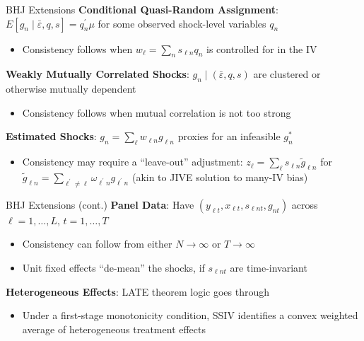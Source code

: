 \documentclass{beamer}
\begin{document}
\begin{frame}{BHJ Extensions}
\vspace{-0.3cm}
\textbf{Conditional Quasi-Random Assignment}: $E[g_n\mid \bar{\varepsilon},q,s]=q_n^\prime \mu$ for some observed shock-level variables $q_n$\smallskip
\begin{itemize}
\item Consistency follows when $w_\ell = \sum_n s_{\ell n} q_n$ is controlled for in the IV
\end{itemize}\medskip\pause{}
\textbf{Weakly Mutually Correlated Shocks}: $g_n\mid (\bar{\varepsilon},q,s)$ are clustered or otherwise mutually dependent \smallskip
\begin{itemize}
\item Consistency follows when mutual correlation is not too strong
\end{itemize}\medskip\pause{}
 \textbf{Estimated Shocks}: $g_n=\sum_\ell w_{\ell n}g_{\ell n}$ proxies for an infeasible $g_n^*$\smallskip
\begin{itemize}
\item Consistency may require a ``leave-out'' adjustment: $z_\ell=\sum_\ell s_{\ell n}\tilde{g}_{\ell n}$ for $\tilde{g}_{\ell n}=\sum_{\ell^\prime\neq \ell} \omega_{\ell^\prime n}g_{\ell^\prime n}$ (akin to JIVE solution to many-IV bias) 
\end{itemize}

\end{frame}


\begin{frame}{BHJ Extensions (cont.)}
\vspace{-0.3cm}
\textbf{Panel Data}: Have $(y_{\ell t},x_{\ell t},s_{\ell n t},g_{n t})$ across $\ell=1,\dots,L$, $t=1,\dots,T$\smallskip
\begin{itemize}
\item Consistency can follow from either $N\rightarrow\infty$ or $T\rightarrow\infty$\smallskip
\item Unit fixed effects ``de-mean'' the shocks, if $s_{\ell n t}$ are time-invariant%
\end{itemize}\medskip\pause{}
\textbf{Heterogeneous Effects}: LATE theorem logic goes through
\begin{itemize}
\item Under a first-stage monotonicity condition, SSIV identifies a convex weighted average of heterogeneous treatment effects
\end{itemize}

\end{frame}
\end{document}

